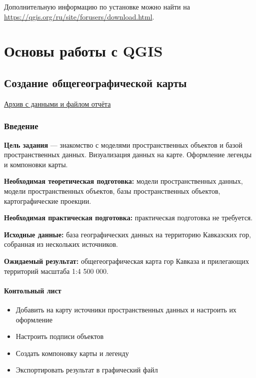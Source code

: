 \documentclass[
  12pt,
]{book}
\providecommand{\tightlist}{%
  \setlength{\itemsep}{0pt}\setlength{\parskip}{0pt}}
\begin{document}
Дополнительную информацию по установке можно найти на \url{https://qgis.org/ru/site/forusers/download.html}.

\hypertarget{part-ux43eux441ux43dux43eux432ux44b-ux440ux430ux431ux43eux442ux44b-ux441-qgis}{%
\part{Основы работы с QGIS}\label{part-ux43eux441ux43dux43eux432ux44b-ux440ux430ux431ux43eux442ux44b-ux441-qgis}}

\hypertarget{map-design-general}{%
\chapter{Создание общегеографической карты}\label{map-design-general}}

\href{https://1drv.ms/u/s!AmtmZDq3JgxHgZUGIl2IXikh_JmrhA?e=NdRmIe}{Архив с данными и файлом отчёта}

\hypertarget{map-design-general-intro}{%
\section{Введение}\label{map-design-general-intro}}

\textbf{Цель задания} --- знакомство с моделями пространственных объектов и базой пространственных данных. Визуализация данных на карте. Оформление легенды и компоновки карты.

\textbf{Необходимая теоретическая подготовка:} модели пространственных данных, модели пространственных объектов, базы пространственных объектов, картографические проекции.

\textbf{Необходимая практическая подготовка:} практическая подготовка не требуется.

\textbf{Исходные данные:} база географических данных на территорию Кавказских гор, собранная из нескольких источников.

\textbf{Ожидаемый результат:} общегеографическая карта гор Кавказа и прилегающих территорий масштаба 1:4 500 000.

\hypertarget{map-design-general-checklist}{%
\subsection{Контольный лист}\label{map-design-general-checklist}}

\begin{itemize}
\tightlist
\item
  Добавить на карту источники пространственных данных и настроить их оформление
\item
  Настроить подписи объектов
\item
  Создать компоновку карты и легенду
\item
  Экспортировать результат в графический файл
\end{itemize}
\end{document}
